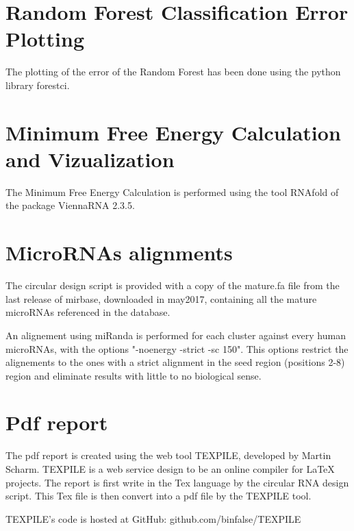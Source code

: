 \documentclass[a4paper,12pt]{report}
\begin{document}
\section{Random Forest Classification Error Plotting}

The plotting of the error of the Random Forest has been done using the python library forestci. 

\section{Minimum Free Energy Calculation and Vizualization}

The Minimum Free Energy Calculation is performed using the tool RNAfold of the package ViennaRNA 2.3.5. \cite{vienna}

\section{MicroRNAs alignments}

The circular design script is provided with a copy of the mature.fa file from the last release of mirbase, downloaded in may2017, containing all the mature microRNAs referenced in the database. 

An alignement using miRanda \cite{Miranda} is performed for each cluster against every human microRNAs, with the options "-noenergy -strict -sc 150". This options restrict the alignements to the ones with a strict alignment in the seed region (positions 2-8) region and eliminate results with little to no biological sense.

\section{Pdf report}

The pdf report is created using the web tool TEXPILE, developed by Martin Scharm. TEXPILE is a web service design to be an online compiler for LaTeX projects. The report is first write in the Tex language by the circular RNA design script. This Tex file is then convert into a pdf file by the TEXPILE tool.

TEXPILE's code is hosted at GitHub: github.com/binfalse/TEXPILE




\end{document}
